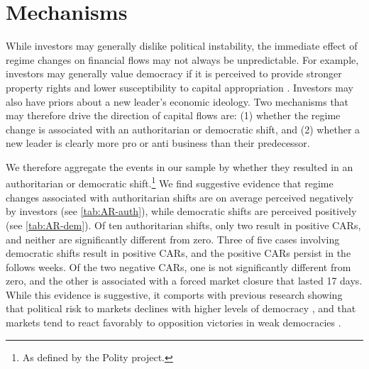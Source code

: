 \documentclass[12pt,final,fleqn]{article}
\theoremstyle{plain}
\begin{document}



\section{Mechanisms} \label{subsec: mechanisms} 

While investors may generally dislike political instability, the immediate effect of regime changes on financial flows may not always be unpredictable. For example, investors may generally value democracy if it is perceived to provide stronger property rights and lower susceptibility to capital appropriation \citep{przeworski1982structure, north1989constitutions, svensson1998investment}. Investors may also have priors about a new leader's economic ideology. Two mechanisms that may therefore drive the direction of capital flows are: (1) whether the regime change is associated with an authoritarian or democratic shift, and (2) whether a new leader is clearly more pro or anti business than their predecessor. 

We therefore aggregate the events in our sample by whether they resulted in an authoritarian or democratic shift.\footnote{As defined by the Polity project.} We find suggestive evidence that regime changes associated with authoritarian shifts are on average perceived negatively by investors (see \autoref{tab:AR-auth}), while democratic shifts are perceived positively (see \autoref{tab:AR-dem}). Of ten authoritarian shifts, only two result in positive CARs, and neither are significantly different from zero. Three of five cases involving democratic shifts result in positive CARs, and the positive CARs persist in the follows weeks. Of the two negative CARs, one is not significantly different from zero, and the other is associated with a forced market closure that lasted 17 days. While this evidence is suggestive, it comports with previous research showing that political risk to markets declines with higher levels of democracy \citep{lehkonen2015democracy}, and that markets tend to react favorably to opposition victories in weak democracies \citep{pantzalis2000political}.

\end{document}
